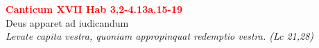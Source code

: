 


\def\greinitialformat#1{%
{\fontsize{39}{39}\selectfont #1}%
}




\vspace{0.3cm}
\begin{center}
 \textcolor{red}{\large \bf Canticum XVII Hab 3,2-4.13a.15-19}\\
Deus apparet ad iudicandum\\
\textit{\small Levate capita vestra, quoniam appropinquat redemptio vestra. (Lc 21,28)}
\end{center}
